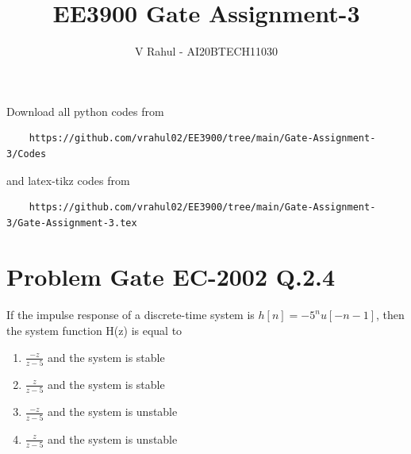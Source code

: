 \documentclass[journal,12pt,twocolumn]{IEEEtran}
\begin{document}
\title{EE3900 Gate Assignment-3}
\author{V Rahul - AI20BTECH11030}
\maketitle
\newpage
\bigskip
\renewcommand{\thefigure}{\theenumi}
\renewcommand{\thetable}{\theenumi}
Download all python codes from 
\begin{lstlisting}
    https://github.com/vrahul02/EE3900/tree/main/Gate-Assignment-3/Codes
\end{lstlisting}
%
and latex-tikz codes from 
%
\begin{lstlisting}
    https://github.com/vrahul02/EE3900/tree/main/Gate-Assignment-3/Gate-Assignment-3.tex
\end{lstlisting}
\section*{Problem Gate EC-2002 Q.2.4}
If the impulse response of a discrete-time system is $h[n]=-5^nu[-n-1]$, then the system function H(z) is equal to\\
\begin{enumerate}
    \item $\frac{-z}{z-5}$ and the system is stable
    \item $\frac{z}{z-5}$ and the system is stable
    \item $\frac{-z}{z-5}$ and the system is unstable
    \item $\frac{z}{z-5}$ and the system is unstable
\end{enumerate}
\end{document}

